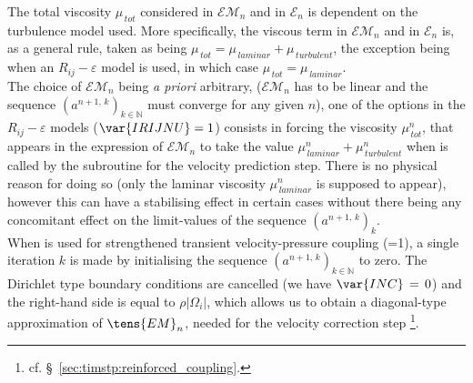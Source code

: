 The total viscosity $\mu_{\,tot}$ considered in $\mathcal{EM}_{n}$ and in
$\mathcal{E}_{n}$ is dependent on the turbulence model used. More specifically, the viscous
term in $\mathcal{EM}_{n}$ and in $\mathcal{E}_{n}$ is, as a general rule, taken as being  $\mu_{\,tot}=\mu_{\,laminar} + \mu_{\,turbulent}$, the exception being when an $R_{ij}-\varepsilon$ model
is used, in which case $\mu_{\,tot}=\mu_{\,laminar}$.\\
The choice of $\mathcal{EM}_{n}$ being  {\it a
priori} arbitrary, ($\mathcal{EM}_{n}$ has to be linear and the sequence
 $(a^{n+1,\,k})_{k\in\mathbb{N}}$ must converge for any given $n$), one of the options in the
$R_{ij}-\varepsilon$ models ($\var{IRIJNU}=1$) consists in forcing the viscosity $\mu_{\,tot}^n$,
that appears in the expression of $\mathcal{EM}_{n}$ to take the value
$\mu_{\,laminar}^n + \mu_{\,turbulent}^n$ when  is called by the subroutine  for the velocity prediction step.  There is no physical reason for doing so (only the laminar viscosity $\mu_{\,laminar}^n$ is supposed to appear), however this can have a stabilising effect in certain cases without there being any concomitant effect on the limit-values of the sequence $(a^{n+1,\,k})_k$.\\

When  is used for strengthened transient velocity-pressure coupling
(=1), a single iteration $k$ is made by initialising the sequence $(a^{n+1,\,k})_{k\in\mathbb{N}}$ to zero. The Dirichlet type boundary conditions are cancelled (we have $\var{INC}\,=\,0$) and the right-hand side is equal to $\rho |\Omega_i|$, which allows us to obtain a diagonal-type approximation of $\tens{EM}_{n}$, needed for the velocity correction step \footnote{cf. \S~\ref{sec:timstp:reinforced_coupling}.}.

